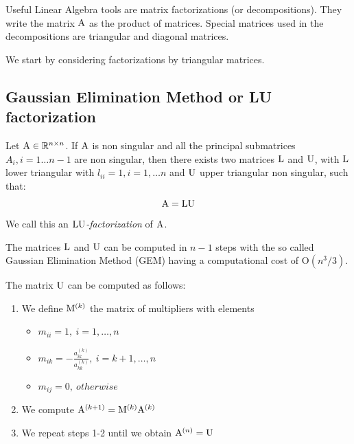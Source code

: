 

Useful Linear Algebra tools are matrix factorizations (or decompositions).
They write the matrix $\mathrm{A}$ as the product of matrices. Special matrices used in the decompositions are triangular and diagonal matrices.

We start by considering factorizations by triangular matrices.

\subsection{Gaussian Elimination Method or LU factorization}

\begin{definition}
    Let $\mathrm{A} \in \mathbb{R}^{n \times n}$. If $\mathrm{A}$ is non singular and all the principal submatrices $A_i, i=1 \ldots n-1$ are non singular, then there exists two matrices $\mathrm{L}$ and $\mathrm{U}$, with $\mathrm{L}$ lower triangular with $l_{ii}=1, i=1, \ldots n$ and $\mathrm{U}$ upper triangular non singular, such that:
    $$ \mathrm{A} = \mathrm{L}\mathrm{U} $$
    We call this an $\mathrm{LU}$\textit{-factorization} of $\mathrm{A}$.
\end{definition}


The matrices $\mathrm{L}$ and $\mathrm{U}$ can be computed in $n-1$ steps with the so called Gaussian Elimination Method (GEM) having a computational cost of 
$\mathrm{O}(n^{3}/3)$.

The matrix $\mathrm{U}$ can be computed as follows:

\begin{enumerate}
     \item We define $\mathrm{M}^{(k)}$ the matrix of multipliers with elements
     \begin{itemize}
         \item $m_{ii}=1,\ i = 1, \hdots, n$
         \item $m_{ik} = - \frac{a^{(k)}_{ik}}{a^{(k)}_{kk}},\ i = k + 1, \hdots, n$
        \item $m_{ij} = 0,\ otherwise$
     \end{itemize}
     \item We compute $\mathrm{A}^{(k+1)} = \mathrm{M}^{(k)}\mathrm{A}^{(k)}$
     \item We repeat steps 1-2 until we obtain $\mathrm{A}^{(n)} = \mathrm{U}$
 \end{enumerate}

